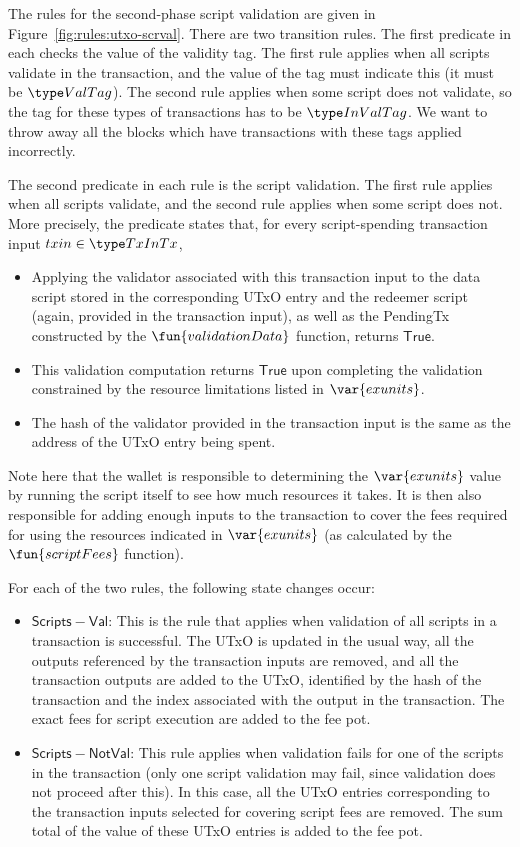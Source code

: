 The rules for the second-phase script validation are given in
Figure~\ref{fig:rules:utxo-scrval}. There are two transition rules.
The first predicate in each checks the value of the validity tag.
The first rule applies when all scripts validate in the transaction,
and the value of the tag must indicate this (it must be $\ValTag$).
The second rule applies when some script does not validate, so the
tag for these types of transactions has to be $\InValTag$. We want to
throw away all the blocks which have transactions with these tags
applied incorrectly.

The second predicate in each rule is the script validation.
The first rule applies when all scripts validate, and the second rule applies when
some script does not.
More precisely, the predicate states that, for every script-spending
transaction input $txin \in \TxInTx$,

\begin{itemize}
\item Applying the validator associated with this transaction input
to the data script stored in the corresponding UTxO entry and the redeemer
script (again, provided in the transaction input), as well as the PendingTx
constructed by the $\fun{validationData}$ function, returns $\mathsf{True}$.
\item This validation computation returns $\mathsf{True}$ upon completing
the validation constrained by the resource limitations listed in $\var{exunits}$.
\item The hash of the validator provided in the transaction input is
the same as the address of the UTxO entry being spent.
\end{itemize}

Note here that the wallet is responsible to determining the $\var{exunits}$ value
by running the script itself to see how much resources it takes. It is then
also responsible for adding enough inputs to the transaction to cover the
fees required for using the resources indicated in $\var{exunits}$ (as
calculated by the $\fun{scriptFees}$ function).

For each of the two rules, the following state changes occur:

\begin{itemize}
  \item $\mathsf{Scripts-Val}$: This is the rule that applies when validation
  of all scripts in a transaction is successful. The UTxO is updated in the usual way, all
  the outputs referenced by the transaction inputs are removed, and all the
  transaction outputs are added to the UTxO, identified by the hash of
  the transaction and the index associated with the output in the transaction.
  The exact fees for script execution are added to the fee pot.

  \item $\mathsf{Scripts-NotVal}$: This rule applies when validation fails
  for one of the scripts in the transaction (only one script validation may fail,
  since validation does not proceed after this). In this case, all the
  UTxO entries corresponding to the transaction inputs selected for covering
  script fees are removed. The sum total of the value of these UTxO entries
  is added to the fee pot.
\end{itemize}


